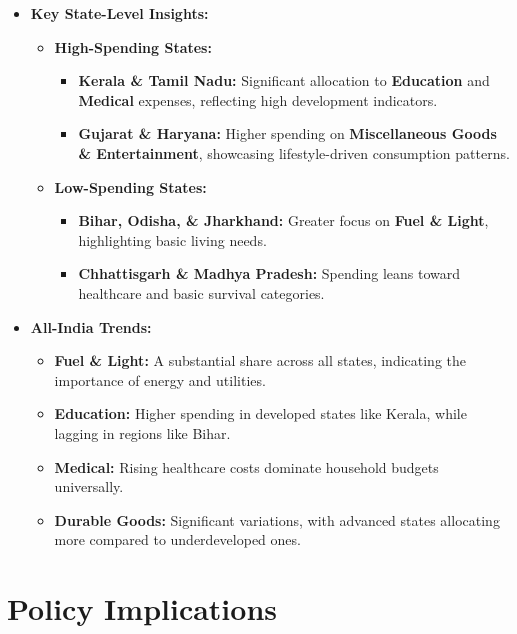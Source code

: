 \documentclass{article}
\begin{document}
\begin{itemize}
	\item \textbf{Key State-Level Insights:}
	\begin{itemize}
		\item \textbf{High-Spending States:}
		\begin{itemize}
			\item \textbf{Kerala \& Tamil Nadu:} Significant allocation to \textbf{Education} and \textbf{Medical} expenses, reflecting high development indicators.
			\item \textbf{Gujarat \& Haryana:} Higher spending on \textbf{Miscellaneous Goods \& Entertainment}, showcasing lifestyle-driven consumption patterns.
		\end{itemize}
		\item \textbf{Low-Spending States:}
		\begin{itemize}
			\item \textbf{Bihar, Odisha, \& Jharkhand:} Greater focus on \textbf{Fuel \& Light}, highlighting basic living needs.
			\item \textbf{Chhattisgarh \& Madhya Pradesh:} Spending leans toward healthcare and basic survival categories.
		\end{itemize}
	\end{itemize}
	
	\item \textbf{All-India Trends:}
	\begin{itemize}
		\item \textbf{Fuel \& Light:} A substantial share across all states, indicating the importance of energy and utilities.
		\item \textbf{Education:} Higher spending in developed states like Kerala, while lagging in regions like Bihar.
		\item \textbf{Medical:} Rising healthcare costs dominate household budgets universally.
		\item \textbf{Durable Goods:} Significant variations, with advanced states allocating more compared to underdeveloped ones.
	\end{itemize}
\end{itemize}

\section*{Policy Implications}
\end{document}
